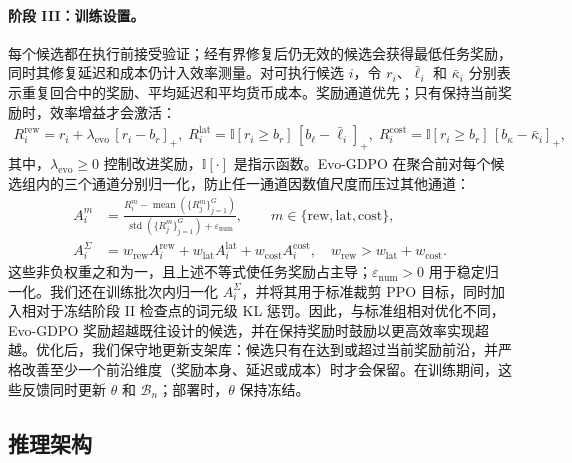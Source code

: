 \documentclass{article}
\begin{document}
\vspace{-0.5em}
\paragraph{阶段 III：训练设置。}
每个候选都在执行前接受验证；经有界修复后仍无效的候选会获得最低任务奖励，同时其修复延迟和成本仍计入效率测量。对可执行候选 $i$，令 $r_i$、$\bar\ell_i$ 和 $\bar\kappa_i$ 分别表示重复回合中的奖励、平均延迟和平均货币成本。奖励通道优先；只有保持当前奖励时，效率增益才会激活：
\begin{equation}
\label{eq:stage3_reward_channel}
\begin{aligned}
R^{\mathrm{rew}}_i = r_i + \lambda_{\mathrm{evo}}\,[r_i - b_r]_{+},\;
R^{\mathrm{lat}}_i = \mathbb{I}[r_i \ge b_r]\,[b_{\ell} - \bar{\ell}_i]_{+},\;
R^{\mathrm{cost}}_i = \mathbb{I}[r_i \ge b_r]\,[b_{\kappa} - \bar{\kappa}_i]_{+},
\end{aligned}
\end{equation}
其中，$\lambda_{\mathrm{evo}}\geq0$ 控制改进奖励，$\mathbb{I}[\cdot]$ 是指示函数。Evo-GDPO 在聚合前对每个候选组内的三个通道分别归一化，防止任一通道因数值尺度而压过其他通道：
\begin{equation}
\label{eq:stage3_decoupled_adv}
\begin{aligned}
A^{m}_{i}
&= \frac{R^{m}_{i} - \operatorname{mean}(\{R^{m}_{j}\}_{j=1}^{G})}
{\operatorname{std}(\{R^{m}_{j}\}_{j=1}^{G}) + \varepsilon_{\mathrm{num}}},
\qquad m\in\{\mathrm{rew},\mathrm{lat},\mathrm{cost}\}, \\
A^{\Sigma}_{i}
&= w_{\mathrm{rew}} A^{\mathrm{rew}}_{i}
+ w_{\mathrm{lat}} A^{\mathrm{lat}}_{i}
+ w_{\mathrm{cost}} A^{\mathrm{cost}}_{i},
\quad w_{\mathrm{rew}}>w_{\mathrm{lat}}+w_{\mathrm{cost}}.
\end{aligned}
\end{equation}
这些非负权重之和为一，且上述不等式使任务奖励占主导；$\varepsilon_{\mathrm{num}}>0$ 用于稳定归一化。我们还在训练批次内归一化 $A_i^{\Sigma}$，并将其用于标准裁剪 PPO 目标，同时加入相对于冻结阶段 II 检查点的词元级 KL 惩罚。因此，与标准组相对优化不同，Evo-GDPO 奖励超越既往设计的候选，并在保持奖励时鼓励以更高效率实现超越。优化后，我们保守地更新支架库：候选只有在达到或超过当前奖励前沿，并严格改善至少一个前沿维度（奖励本身、延迟或成本）时才会保留。在训练期间，这些反馈同时更新 $\theta$ 和 $\mathcal{B}_n$；部署时，$\theta$ 保持冻结。

\vspace{-0.5em}
\subsection{推理架构}
\vspace{-0.5em}
\end{document}
